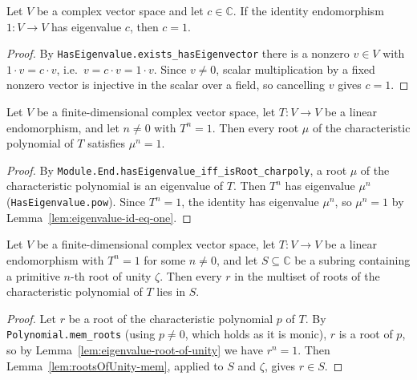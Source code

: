 \begin{lemma}
    \label{lem:eigenvalue-id-eq-one}
    \leanok
    Let $V$ be a complex vector space and let $c \in \mathbb{C}$. If the identity
    endomorphism $1 : V \to V$ has eigenvalue $c$, then $c = 1$.
\end{lemma}
\begin{proof}
    By \texttt{HasEigenvalue.exists\_hasEigenvector} there is a nonzero $v \in V$
    with $1 \cdot v = c \cdot v$, i.e.\ $v = c \cdot v = 1 \cdot v$. Since $v \neq
    0$, scalar multiplication by a fixed nonzero vector is injective in the scalar
    over a field, so cancelling $v$ gives $c = 1$.
\end{proof}

\begin{lemma}
    \label{lem:eigenvalue-root-of-unity}
    \leanok
    Let $V$ be a finite-dimensional complex vector space, let $T : V \to V$ be a
    linear endomorphism, and let $n \neq 0$ with $T^n = 1$. Then every root $\mu$
    of the characteristic polynomial of $T$ satisfies $\mu^n = 1$.
\end{lemma}
\begin{proof}
    By \texttt{Module.End.hasEigenvalue\_iff\_isRoot\_charpoly}, a root $\mu$ of
    the characteristic polynomial is an eigenvalue of $T$. Then $T^n$ has
    eigenvalue $\mu^n$ (\texttt{HasEigenvalue.pow}). Since $T^n = 1$, the identity
    has eigenvalue $\mu^n$, so $\mu^n = 1$ by
    Lemma~\ref{lem:eigenvalue-id-eq-one}.
\end{proof}

\begin{lemma}
    \label{lem:charpoly-roots-mem-range}
    \leanok
    Let $V$ be a finite-dimensional complex vector space, let $T : V \to V$ be a
    linear endomorphism with $T^n = 1$ for some $n \neq 0$, and let
    $S \subseteq \mathbb{C}$ be a subring containing a primitive $n$-th root of
    unity $\zeta$. Then every $r$ in the multiset of roots of the characteristic
    polynomial of $T$ lies in $S$.
\end{lemma}
\begin{proof}
    Let $r$ be a root of the characteristic polynomial $p$ of $T$. By
    \texttt{Polynomial.mem\_roots} (using $p \neq 0$, which holds as it is monic),
    $r$ is a root of $p$, so by Lemma~\ref{lem:eigenvalue-root-of-unity} we have
    $r^n = 1$. Then Lemma~\ref{lem:rootsOfUnity-mem}, applied to $S$ and $\zeta$,
    gives $r \in S$.
\end{proof}

